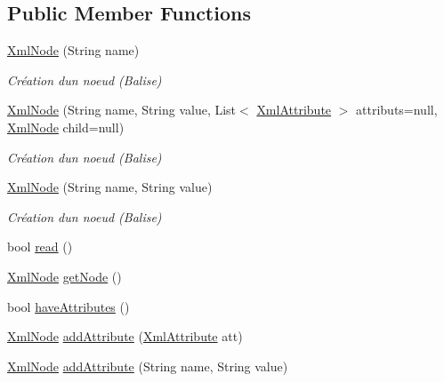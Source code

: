 \subsection*{Public Member Functions}
\begin{DoxyCompactItemize}
\item 
\mbox{\hyperlink{class_n_t_k_1_1_i_o_1_1_xml_1_1_xml_node_ad29487ba5adb4e83915bc08e2f69baf2}{Xml\+Node}} (String name)
\begin{DoxyCompactList}\small\item\em Création d\textquotesingle{}un noeud (Balise) \end{DoxyCompactList}\item 
\mbox{\hyperlink{class_n_t_k_1_1_i_o_1_1_xml_1_1_xml_node_a2d269cfb06f087317939c542f095dc5f}{Xml\+Node}} (String name, String value, List$<$ \mbox{\hyperlink{class_n_t_k_1_1_i_o_1_1_xml_1_1_xml_attribute}{Xml\+Attribute}} $>$ attributs=null, \mbox{\hyperlink{class_n_t_k_1_1_i_o_1_1_xml_1_1_xml_node}{Xml\+Node}} child=null)
\begin{DoxyCompactList}\small\item\em Création d\textquotesingle{}un noeud (Balise) \end{DoxyCompactList}\item 
\mbox{\hyperlink{class_n_t_k_1_1_i_o_1_1_xml_1_1_xml_node_acd1c7c6f312efd395aa8f5277c0dfb4f}{Xml\+Node}} (String name, String value)
\begin{DoxyCompactList}\small\item\em Création d\textquotesingle{}un noeud (Balise) \end{DoxyCompactList}\item 
bool \mbox{\hyperlink{class_n_t_k_1_1_i_o_1_1_xml_1_1_xml_node_a4aff059c05655efaa40a63b0ff01a4c0}{read}} ()
\item 
\mbox{\hyperlink{class_n_t_k_1_1_i_o_1_1_xml_1_1_xml_node}{Xml\+Node}} \mbox{\hyperlink{class_n_t_k_1_1_i_o_1_1_xml_1_1_xml_node_afffa099c55bd6b0a5d01ab971c650225}{get\+Node}} ()
\item 
bool \mbox{\hyperlink{class_n_t_k_1_1_i_o_1_1_xml_1_1_xml_node_a4b95bcfbcde269189d71dfc7918db6f4}{have\+Attributes}} ()
\item 
\mbox{\hyperlink{class_n_t_k_1_1_i_o_1_1_xml_1_1_xml_node}{Xml\+Node}} \mbox{\hyperlink{class_n_t_k_1_1_i_o_1_1_xml_1_1_xml_node_a95ee3c8d64d332b3f544cbbca7b8ae62}{add\+Attribute}} (\mbox{\hyperlink{class_n_t_k_1_1_i_o_1_1_xml_1_1_xml_attribute}{Xml\+Attribute}} att)
\item 
\mbox{\hyperlink{class_n_t_k_1_1_i_o_1_1_xml_1_1_xml_node}{Xml\+Node}} \mbox{\hyperlink{class_n_t_k_1_1_i_o_1_1_xml_1_1_xml_node_abb83c88c7af84057a09eebb2dce671bb}{add\+Attribute}} (String name, String value)

\end{DoxyCompactItemize}
